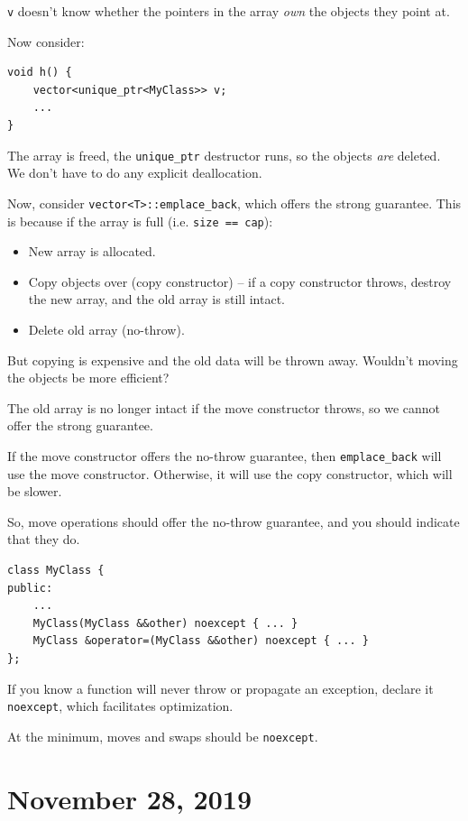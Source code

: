 \documentclass[11pt]{article}
\theoremstyle{definition}
\begin{document}
{\tt v} doesn't know whether the pointers in the array \emph{own} the objects they point at.

Now consider:
\begin{lstlisting}
void h() {
    vector<unique_ptr<MyClass>> v;
    ...
}
\end{lstlisting}
\vspace{-1.5ex}
The array is freed, the {\tt unique\_ptr} destructor runs, so the objects \emph{are} deleted. We don't have to do any explicit deallocation.

Now, consider {\tt vector<T>::emplace\_back}, which offers the strong guarantee. This is because if the array is full (i.e. {\tt size == cap}):\vspace{-1.5ex}
\begin{itemize}
    \item New array is allocated.
    \item Copy objects over (copy constructor) -- if a copy constructor throws, destroy the new array, and the old array is still intact.
    \item Delete old array (no-throw).
\end{itemize}
\vspace{-1.5ex}
But copying is expensive and the old data will be thrown away. Wouldn't moving the objects be more efficient? 

The old array is no longer intact if the move constructor throws, so we cannot offer the strong guarantee.

If the move constructor offers the no-throw guarantee, then {\tt emplace\_back} will use the move constructor. Otherwise, it will use the copy constructor, which will be slower.

So, move operations should offer the no-throw guarantee, and you should indicate that they do.
\begin{lstlisting}
class MyClass {
public:
    ...
    MyClass(MyClass &&other) noexcept { ... }
    MyClass &operator=(MyClass &&other) noexcept { ... }
};
\end{lstlisting}
\vspace{-1.5ex}
If you know a function will never throw or propagate an exception, declare it {\tt noexcept}, which facilitates optimization. 

At the minimum, moves and swaps should be {\tt noexcept}.

\newpage
\section{November 28, 2019}
\end{document}
